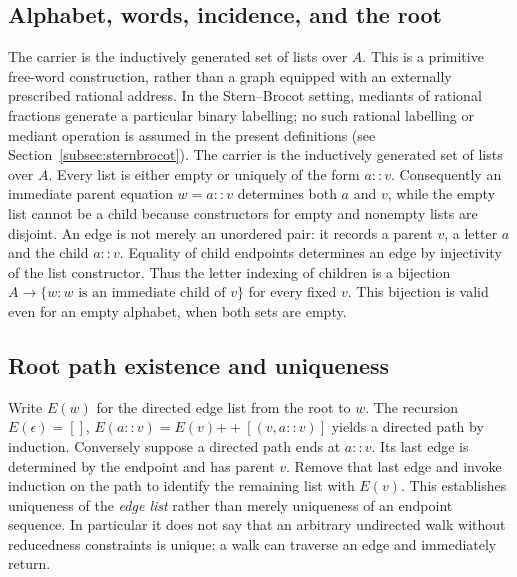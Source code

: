 \subsection{Alphabet, words, incidence, and the root}\label{supp:2-1}
\par{}\par\smallskip

The carrier is the inductively generated set of lists over $A$. This is a primitive free-word construction, rather than a graph equipped with an externally prescribed rational address. In the Stern--Brocot setting, mediants of rational fractions generate a particular binary labelling; no such rational labelling or mediant operation is assumed in the present definitions (see Section~\ref{subsec:sternbrocot}). The carrier is the inductively generated set of lists over $A$. Every list is either empty or uniquely of the form $a::v$. Consequently an immediate parent equation $w=a::v$ determines both $a$ and $v$, while the empty list cannot be a child because constructors for empty and nonempty lists are disjoint. An edge is not merely an unordered pair: it records a parent $v$, a letter $a$ and the child $a::v$. Equality of child endpoints determines an edge by injectivity of the list constructor. Thus the letter indexing of children is a bijection $A\to\{w:w\text{ is an immediate child of }v\}$ for every fixed $v$. This bijection is valid even for an empty alphabet, when both sets are empty.

\subsection{Root path existence and uniqueness}\label{supp:2-2}
\par{}\par\smallskip

Write $E(w)$ for the directed edge list from the root to $w$. The recursion $E(\epsilon)=[]$, $E(a::v)=E(v)\mathbin{+\!+}[(v,a::v)]$ yields a directed path by induction. Conversely suppose a directed path ends at $a::v$. Its last edge is determined by the endpoint and has parent $v$. Remove that last edge and invoke induction on the path to identify the remaining list with $E(v)$. This establishes uniqueness of the \emph{edge list} rather than merely uniqueness of an endpoint sequence. In particular it does not say that an arbitrary undirected walk without reducedness constraints is unique: a walk can traverse an edge and immediately return.

